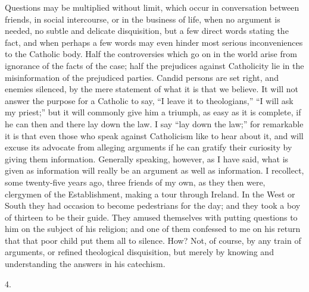 Questions may be multiplied without limit, which occur in
conversation between friends, in social intercourse, or in the
business of life, when no argument is needed, no subtle and delicate
disquisition, but a few direct words stating the fact, and when
perhaps a few words may even hinder most serious inconveniences to the
Catholic body. Half the controversies which go on in the world arise
from ignorance of the facts of the case; half the prejudices against
Catholicity lie in the misinformation of the prejudiced parties.
Candid persons are set right, and enemies silenced, by the mere
statement of what it is that we believe. It will not answer the
purpose for a Catholic to say, ``I leave it to theologians,''
``I will ask my priest;'' but it will commonly give him a
triumph, as easy as it is complete, if he can then and there lay down
the law. I say ``lay down the law;'' for remarkable it is that
even those who speak against Catholicism like to hear about it, and
will excuse its advocate from alleging arguments if he can gratify
their curiosity by giving them information. Generally speaking,
however, as I have said, what is given as information will really be
an argument as well as information. I recollect, some twenty-five
years ago, three friends of my own, as they then were, clergymen of
the Establishment, making a tour through Ireland. In the West or South
they had occasion to become pedestrians for the day; and they took a
boy of thirteen to be their guide. They amused themselves with putting
questions to him on the subject of his religion; and one of them
confessed to me on his return that that poor child put them all to
silence. How? Not, of course, by any train of arguments, or refined
theological disquisition, but merely by knowing and understanding the
answers in his catechism.

4.

